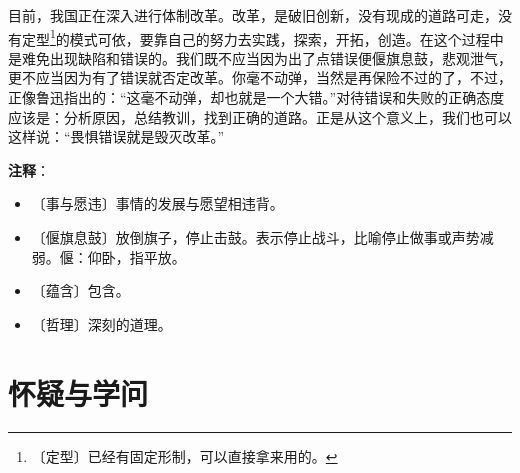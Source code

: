 \documentclass[12pt,UTF-8,openany]{ctexbook}
\begin{document}
\begin{large}
    目前，我国正在深入进行体制改革。改革，是破旧创新，没有现成的道路可走，没有定型\footnote{〔定型〕已经有固定形制，可以直接拿来用的。}的模式可依，要靠自己的努力去实践，探索，开拓，创造。在这个过程中是难免出现缺陷和错误的。我们既不应当因为出了点错误便偃旗息鼓，悲观泄气，更不应当因为有了错误就否定改革。你毫不动弹，当然是再保险不过的了，不过，正像鲁迅指出的：“这毫不动弹，却也就是一个大错。”对待错误和失败的正确态度应该是：分析原因，总结教训，找到正确的道路。正是从这个意义上，我们也可以这样说：“畏惧错误就是毁灭改革。”
    
\end{large}


\newpage

\textbf{注释}：

\vspace{-1em}

\begin{itemize}
    \setlength\itemsep{-0.2em}
    \item 〔事与愿违〕事情的发展与愿望相违背。
    \item 〔偃旗息鼓〕放倒旗子，停止击鼓。表示停止战斗，比喻停止做事或声势减弱。偃：仰卧，指平放。
    \item 〔蕴含〕包含。
    \item 〔哲理〕深刻的道理。
\end{itemize}

\chapter{怀疑与学问}
\end{document}
